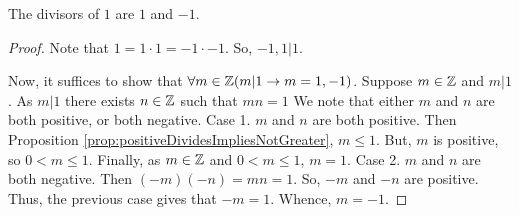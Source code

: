 \guard





\begin{prop}
\label{prop:divisorsOf1}
  The divisors of $1$ are $1$ and $-1$.
\end{prop}
\begin{proof}
  Note that $1=1\cdot 1=-1\cdot-1$.
  So, $-1,1\vert 1$.

  Now, it suffices to show that $\forall m\in\mathbb{Z}( m\vert 1\rightarrow m=1,-1)$.
  Suppose $m\in\mathbb{Z}$ and $m\vert 1$.
  As $m\vert 1$ there exists $n\in\mathbb{Z}$ such that $mn=1$
  We note that either $m$ and $n$ are both positive, or both negative.
  Case 1. $m$ and $n$ are both positive.
    Then Proposition \ref{prop:positiveDividesImpliesNotGreater}, $m\leq 1$.
    But, $m$ is positive, so $0<m\leq 1$.
    Finally, as $m\in\mathbb{Z}$ and $0<m\leq 1$, $m=1$.
  Case 2. $m$ and $n$ are both negative.
    Then $(-m)(-n)=mn=1$.
    So, $-m$ and $-n$ are positive.
    Thus, the previous case gives that $-m=1$.
    Whence, $m=-1$.


\end{proof}

